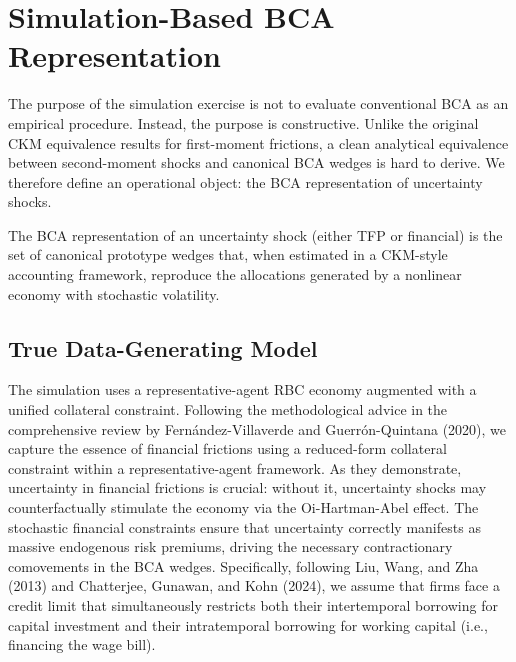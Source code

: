 \section{Simulation-Based BCA Representation}

The purpose of the simulation exercise is not to evaluate conventional BCA as an
empirical procedure. Instead, the purpose is constructive. Unlike the original
CKM equivalence results for first-moment frictions, a clean analytical
equivalence between second-moment shocks and canonical BCA wedges is hard to
derive. We therefore define an operational object: the BCA representation of
uncertainty shocks.

\begin{definition}
The BCA representation of an uncertainty shock (either TFP or financial) is the
set of canonical prototype wedges that, when estimated in a CKM-style accounting
framework, reproduce the allocations generated by a nonlinear economy with
stochastic volatility.
\end{definition}

\subsection{True Data-Generating Model}

The simulation uses a representative-agent RBC economy augmented with a unified
collateral constraint. Following the methodological advice in the comprehensive
review by Fern\'andez-Villaverde and Guerr\'on-Quintana (2020), we capture the
essence of financial frictions using a reduced-form collateral constraint within
a representative-agent framework. As they demonstrate, uncertainty in financial
frictions is crucial: without it, uncertainty shocks may counterfactually stimulate
the economy via the Oi-Hartman-Abel effect. The stochastic financial constraints
ensure that uncertainty correctly manifests as massive endogenous risk premiums,
driving the necessary contractionary comovements in the BCA wedges. Specifically,
following Liu, Wang, and Zha (2013) and Chatterjee, Gunawan, and Kohn (2024),
we assume that firms face a credit limit that simultaneously restricts both their
intertemporal borrowing for capital investment and their intratemporal borrowing
for working capital (i.e., financing the wage bill).

